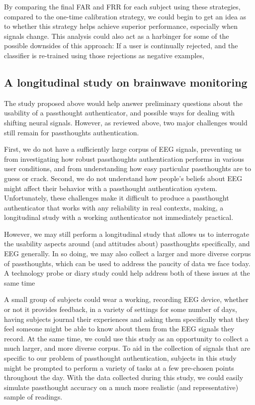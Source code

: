 \documentclass[sigconf]{acmart}
\begin{document}
By comparing the final FAR and FRR for each subject using these strategies, 
compared to the one-time calibration strategy, we could begin to get an idea as to whether
this strategy helps achieve superior performance, especially when signals change.
This analysis could also act as a harbinger for some of the possible downsides of this approach:
If a user is continually rejected, and the classifier is re-trained using those rejections as negative examples,

\subsection{A longitudinal study on brainwave monitoring}
\label{sec:orgc659ab1}

The study proposed above would help answer preliminary questions about
the usability of a passthought authenticator,
and possible ways for dealing with shifting neural signals.
However, as reviewed above, two major challenges would still remain for passthoughts authentication.

First, we do not have a sufficiently large corpus of EEG signals, 
preventing us from investigating how robust passthoughts authentication performs in various user conditions,
and from understanding how easy particular passthoughts are to guess or crack.
Second, we do not understand how people's beliefs about EEG might affect their behavior with a passthought authentication system.
Unfortunately, these challenges make it difficult to produce a passthought authenticator that works with any reliability in real contexts,
making, a longitudinal study with a working authenticator not immediately practical.

However, we may still perform a longitudinal study that allows us to interrogate the usability aspects around (and attitudes about) passthoughts specifically, and EEG generally.
In so doing, we may also collect a larger and more diverse corpus of passthoughts, which can be used to address the paucity of data we face today.
A technology probe or diary study \cite{Gaver1999} could help address both of these issues at the same time 

A small group of subjects could wear a working, recording EEG device, whether or not it provides feedback, in a variety of settings for some number of days,
having subjects journal their experiences and asking them specifically what they feel someone might be able to know about them from the EEG signals they record.
At the same time, we could use this study as an opportunity to collect a much larger, and more diverse corpus.
To aid in the collection of signals that are specific to our problem of passthought authentication,
subjects in this study might be prompted to perform a variety of tasks at a few pre-chosen points throughout the day.
With the data collected during this study, we could easily simulate passthought accuracy on a much more realistic (and representative) sample of readings.
\end{document}
